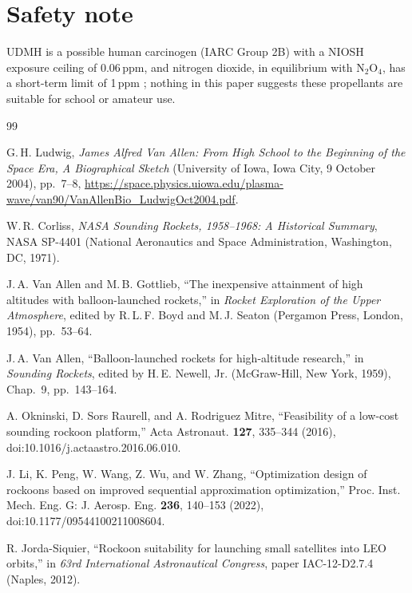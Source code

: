 \documentclass[11pt,a4paper]{article}
\begin{document}
\section{Safety note}
\label{app:hazards}

UDMH is a possible human carcinogen (IARC Group 2B) with a NIOSH exposure ceiling of 0.06\,ppm, and nitrogen dioxide, in equilibrium with N$_2$O$_4$, has a short-term limit of 1\,ppm \cite{iarc,nioshudmh,nioshno2}; nothing in this paper suggests these propellants are suitable for school or amateur use.

\begin{thebibliography}{99}

 G.\,H. Ludwig, \emph{James Alfred Van Allen: From High School to the Beginning of the Space Era, A Biographical Sketch} (University of Iowa, Iowa City, 9 October 2004), pp.~7--8, \url{https://space.physics.uiowa.edu/plasma-wave/van90/VanAllenBio_LudwigOct2004.pdf}.

 W.\,R. Corliss, \emph{NASA Sounding Rockets, 1958--1968: A Historical Summary}, NASA SP-4401 (National Aeronautics and Space Administration, Washington, DC, 1971).

 J.\,A. Van Allen and M.\,B. Gottlieb, ``The inexpensive attainment of high altitudes with balloon-launched rockets,'' in \emph{Rocket Exploration of the Upper Atmosphere}, edited by R.\,L.\,F. Boyd and M.\,J. Seaton (Pergamon Press, London, 1954), pp.~53--64.

 J.\,A. Van Allen, ``Balloon-launched rockets for high-altitude research,'' in \emph{Sounding Rockets}, edited by H.\,E. Newell, Jr. (McGraw-Hill, New York, 1959), Chap.~9, pp.~143--164.

 A. Okninski, D. Sors Raurell, and A. Rodriguez Mitre, ``Feasibility of a low-cost sounding rockoon platform,'' Acta Astronaut. \textbf{127}, 335--344 (2016), doi:10.1016/j.actaastro.2016.06.010.

 J. Li, K. Peng, W. Wang, Z. Wu, and W. Zhang, ``Optimization design of rockoons based on improved sequential approximation optimization,'' Proc. Inst. Mech. Eng. G: J. Aerosp. Eng. \textbf{236}, 140--153 (2022), doi:10.1177/09544100211008604.

 R. Jorda-Siquier, ``Rockoon suitability for launching small satellites into LEO orbits,'' in \emph{63rd International Astronautical Congress}, paper IAC-12-D2.7.4 (Naples, 2012).


\end{thebibliography}
\end{document}
